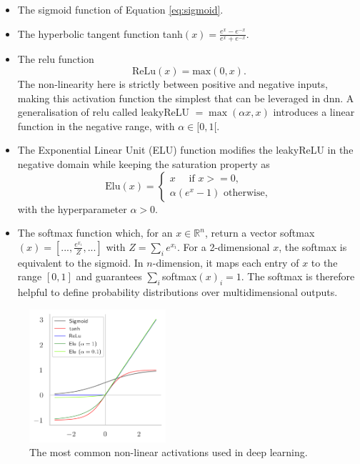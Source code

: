 \begin{itemize}
    \item The sigmoid function of Equation \ref{eq:sigmoid}.
    \item The hyperbolic tangent function tanh$(x) = \frac{e^x - e^{-x}}{e^x + e^{-x}}$.
    \item The \gls{relu} function\cite{agarap2019deep}
    \begin{equation}\label{eq:relu}
        \text{ReLu}(x) = \text{max}(0, x).
    \end{equation}
    The non-linearity here is strictly between positive and negative inputs, making this activation function the simplest that can be leveraged in \gls{dnn}. A generalisation of \gls{relu} called leakyReLU $= \max(\alpha x, x)$ introduces a linear function in the negative range, with $\alpha \in [0, 1[$. 
    \item The Exponential Linear Unit (ELU) function modifies the leakyReLU in the negative domain while keeping the saturation property as
    \begin{equation}\label{eq:elu}
        \text{Elu}(x) = 
        \begin{cases}
            x \quad \text{ if } x >= 0, \\
            \alpha (e^x - 1) \text{ otherwise},
        \end{cases}
    \end{equation}
    with the hyperparameter $\alpha > 0$.
    \item The softmax function which, for an $x \in \mathbb{R}^n$, return a vector softmax$(x) = [..., \frac{e^{x_i}}{Z}, ...]$ with $Z = \sum_i e^{x_i}$. For a 2-dimensional $x$, the softmax is equivalent to the sigmoid. In $n$-dimension, it maps each entry of $x$ to the range $[0, 1]$ and guarantees $\sum_i $softmax$(x)_i = 1$. The softmax is therefore helpful to define probability distributions over multidimensional outputs.
\end{itemize}

\begin{figure}
    \begin{center}
        \includegraphics[width=0.45\textwidth]{Images/ML/activations.png}
        \caption{The most common non-linear activations used in deep learning.} 
        \label{fig:commonAct}
    \end{center}
\end{figure}

